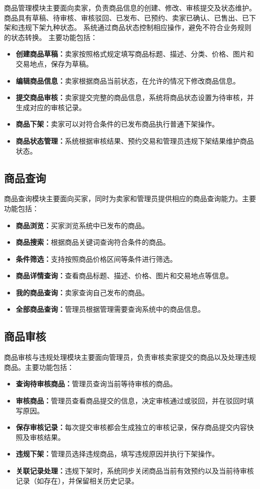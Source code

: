 \documentclass[12pt,a4paper]{article}
\begin{document}
	商品管理模块主要面向卖家，负责商品信息的创建、修改、审核提交及状态维护。商品具有草稿、待审核、审核驳回、已发布、已预约、卖家已确认、已售出、已下架和违规下架九种状态。
	系统通过商品状态控制相应操作，避免不符合业务规则的状态转换。
	主要功能包括：
	\begin{itemize}
		\item \textbf{创建商品草稿：}卖家按照格式规定填写商品标题、描述、分类、价格、图片和交易地点，保存为草稿。
		\item \textbf{编辑商品信息：}卖家根据商品当前状态，在允许的情况下修改商品信息。
		\item \textbf{提交商品审核：}卖家提交完整的商品信息，系统将商品状态设置为待审核，并生成对应的审核记录。
		\item \textbf{商品下架：}卖家可以对符合条件的已发布商品执行普通下架操作。
		\item \textbf{商品状态管理：}系统根据审核结果、预约交易和管理员违规下架结果维护商品状态。
	\end{itemize}
	
	\subsection{商品查询}
	
	商品查询模块主要面向买家，同时为卖家和管理员提供相应的商品查询能力。主要功能包括：
	\begin{itemize}
		\item \textbf{商品浏览：}买家浏览系统中已发布的商品。
		\item \textbf{商品搜索：}根据商品关键词查询符合条件的商品。
		\item \textbf{条件筛选：}支持按照商品价格区间等条件进行筛选。
		\item \textbf{商品详情查询：}查看商品标题、描述、价格、图片和交易地点等信息。
		\item \textbf{我的商品查询：}卖家查询自己发布的商品。
		\item \textbf{全部商品查询：}管理员根据管理需要查询系统中的商品信息。
	\end{itemize}
	
	\subsection{商品审核}
	
	商品审核与违规处理模块主要面向管理员，负责审核卖家提交的商品以及处理违规商品。主要功能包括：
	\begin{itemize}
		\item \textbf{查询待审核商品：}管理员查询当前等待审核的商品。
		\item \textbf{审核商品：}管理员查看商品提交的信息，决定审核通过或驳回，并在驳回时填写原因。
		\item \textbf{保存审核记录：}每次提交审核都会生成独立的审核记录，保存商品提交内容快照及审核结果。
		\item \textbf{违规下架：}管理员选择违规商品，填写违规原因并执行下架操作。
		\item \textbf{关联记录处理：}违规下架时，系统同步关闭商品当前有效预约以及当前待审核记录（如存在），并保留相关历史记录。
	\end{itemize}
	
\end{document}
